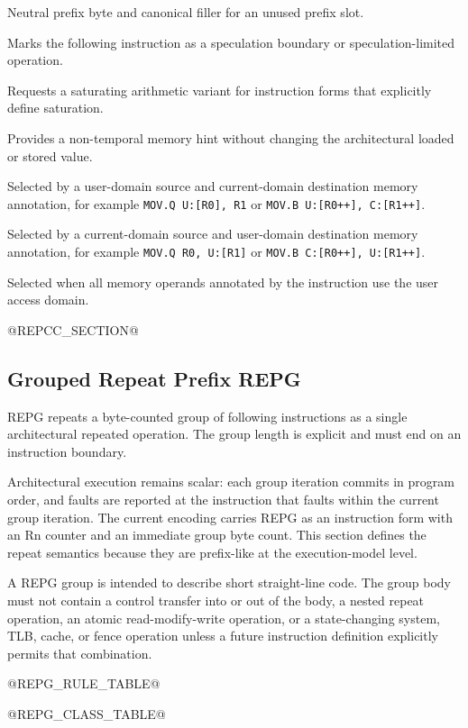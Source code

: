 \begin{description}[style=nextline,leftmargin=1.42in,labelwidth=1.32in,itemsep=3pt,topsep=3pt]
\item[NPX] Neutral prefix byte and canonical filler for an unused prefix slot.
\item[NOSPEC] Marks the following instruction as a speculation boundary or speculation-limited operation.
\item[SAT] Requests a saturating arithmetic variant for instruction forms that explicitly define saturation.
\item[NT] Provides a non-temporal memory hint without changing the architectural loaded or stored value.
\item[U2C] Selected by a user-domain source and current-domain destination memory annotation, for example
\texttt{MOV.Q U:[R0], R1} or \texttt{MOV.B U:[R0++], C:[R1++]}.
\item[C2U] Selected by a current-domain source and user-domain destination memory annotation, for example
\texttt{MOV.Q R0, U:[R1]} or \texttt{MOV.B C:[R0++], U:[R1++]}.
\item[U2U] Selected when all memory operands annotated by the instruction use the user access domain.
\end{description}

@REPCC_SECTION@

\subsection{Grouped Repeat Prefix REPG}
REPG repeats a byte-counted group of following instructions as a single architectural repeated operation. The
group length is explicit and must end on an instruction boundary.

Architectural execution remains scalar: each group iteration commits in program order, and faults are reported
at the instruction that faults within the current group iteration. The current encoding carries REPG as an
instruction form with an Rn counter and an immediate group byte count. This section defines the repeat semantics
because they are prefix-like at the execution-model level.

A REPG group is intended to describe short straight-line code. The group body must not contain a control
transfer into or out of the body, a nested repeat operation, an atomic read-modify-write operation, or a
state-changing system, TLB, cache, or fence operation unless a future instruction definition explicitly permits
that combination.

@REPG_RULE_TABLE@

@REPG_CLASS_TABLE@
